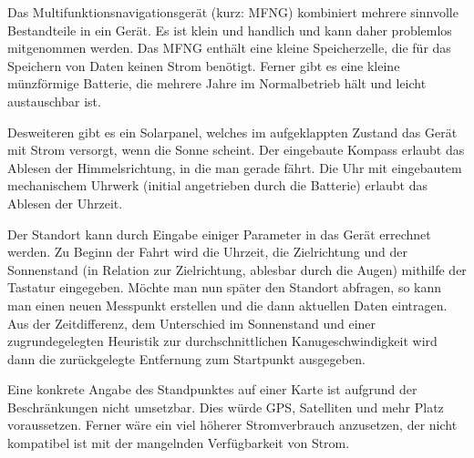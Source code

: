 \documentclass[a4paper,10pt]{scrartcl}
\begin{document}

Das Multifunktionsnavigationsgerät (kurz: MFNG) kombiniert mehrere sinnvolle Bestandteile in ein Gerät. Es ist klein und handlich und kann daher problemlos mitgenommen werden. Das MFNG enthält eine kleine Speicherzelle, die für das Speichern von Daten keinen Strom benötigt. Ferner gibt es eine kleine münzförmige Batterie, die mehrere Jahre im Normalbetrieb hält und leicht austauschbar ist.

Desweiteren gibt es ein Solarpanel, welches im aufgeklappten Zustand das Gerät mit Strom versorgt, wenn die Sonne scheint. Der eingebaute Kompass erlaubt das Ablesen der Himmelsrichtung, in die man gerade fährt. Die Uhr mit eingebautem mechanischem Uhrwerk (initial angetrieben durch die Batterie) erlaubt das Ablesen der Uhrzeit.

Der Standort kann durch Eingabe einiger Parameter in das Gerät errechnet werden. Zu Beginn der Fahrt wird die Uhrzeit, die Zielrichtung und der Sonnenstand (in Relation zur Zielrichtung, ablesbar durch die Augen) mithilfe der Tastatur eingegeben. Möchte man nun später den Standort abfragen, so kann man einen neuen Messpunkt erstellen und die dann aktuellen Daten eintragen. Aus der Zeitdifferenz, dem Unterschied im Sonnenstand und einer zugrundegelegten Heuristik zur durchschnittlichen Kanugeschwindigkeit wird dann die zurückgelegte Entfernung zum Startpunkt ausgegeben.

Eine konkrete Angabe des Standpunktes auf einer Karte ist aufgrund der Beschränkungen nicht umsetzbar. Dies würde GPS, Satelliten und mehr Platz voraussetzen. Ferner wäre ein viel höherer Stromverbrauch anzusetzen, der nicht kompatibel ist mit der mangelnden Verfügbarkeit von Strom.
\end{document}
